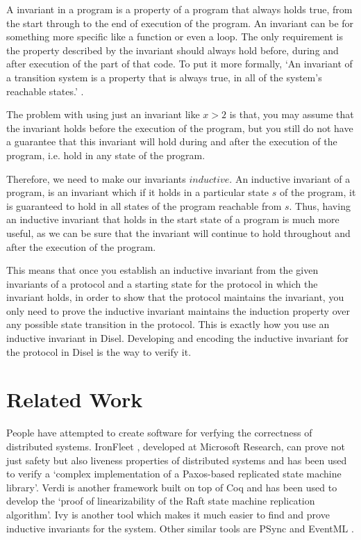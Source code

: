 A invariant in a program is a property of a program that always holds true,
from the start through to the end of execution of the program. An invariant can be for something
more specific like a function or even a loop. The only requirement is the property
described by the invariant should always hold before, during and after execution
of the part of that code. To put it more formally,
`An invariant of a transition system is a property that is
always true, in all of the system’s reachable states.' \cite{21}.

The problem with using just an invariant like $x > 2$ is that, you may assume
that the invariant holds before the execution of the program, but you still
do not have a guarantee that this invariant will hold during and after the
execution of the program, i.e. hold in any state of the program.

Therefore, we need to make our invariants $inductive$. An inductive invariant
of a program, is an invariant which if it holds in a particular state $s$ of the
program, it is guaranteed to hold in all states of the program reachable from $s$.
Thus, having an inductive invariant that holds in the start state of a program
is much more useful, as we can be sure that the invariant will continue to
hold throughout and after the execution of the program.

This means that once you establish an inductive invariant from the given invariants
of a protocol and a starting state for the protocol in which the invariant holds,
in order to show that the protocol maintains the invariant, you only need to
prove the inductive invariant maintains the induction property over any possible state
transition in the protocol. This is exactly how you use an inductive invariant in
Disel. Developing and encoding the inductive invariant for the protocol in Disel
is the way to verify it.


\section{Related Work}
People have attempted to create software for verfying the correctness of distributed
systems. IronFleet \cite{15}, developed at Microsoft Research, can prove not just
safety but also liveness properties of distributed systems and has been used
to verify a `complex implementation of a Paxos-based replicated state machine
library'. Verdi \cite{16} is another framework built on top of Coq and has been used
to develop the `proof of linearizability of the Raft state machine replication
algorithm'. Ivy \cite{19} is another tool which makes it much easier to find and
prove inductive invariants for the system. Other similar tools are PSync \cite{17}
and EventML \cite{18}.
